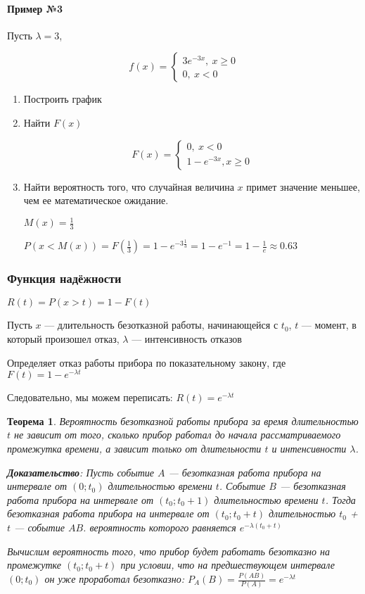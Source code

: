 \documentclass{article}
\newtheorem{theorem}{Теорема}
\begin{document}
\paragraph{Пример №3}

Пусть $\lambda = 3$,

$$f(x) = \begin{cases}
    3e^{-3x}, \ x \ge 0 \\
    0, \ x < 0
\end{cases}$$

\begin{enumerate}
    \item Построить график
    \item Найти $F(x)$

    $$F(x) = \begin{cases}
        0, \ x < 0 \\
        1 - e^{-3x}, x \ge 0
    \end{cases}$$
    \item Найти вероятность того, что случайная величина $x$ примет значение меньшее, чем ее математическое ожидание.
    
    $M(x) = \frac{1}{3}$

    $P(x < M(x)) = F(\frac{1}{3}) = 1 - e^{-3 \frac{1}{3}} = 1 - e^{-1} = 1 - \frac{1}{e} \approx 0.63$
\end{enumerate}

\subsubsection{Функция надёжности}

$R(t) = P(x > t) = 1 - F(t)$

Пусть $x$ — длительность безотказной работы, начинающейся с $t_0$, $t$ — момент, в который произошел отказ, $\lambda$ — интенсивность отказов

Определяет отказ работы прибора по показательному закону, где $F(t) = 1 - e^{-\lambda t}$

Следовательно, мы можем переписать: $R(t) = e^{-\lambda t}$

\begin{theorem}
    Вероятность безотказной работы прибора за время длительностью $t$ не зависит от того, сколько прибор работал до начала рассматриваемого промежутка времени, а зависит только от длительности $t$ и интенсивности $\lambda$.

    \textbf{Доказательство}: Пусть событие $A$ — безотказная работа прибора на интервале от $(0; t_0)$ длительностью времени $t$. Событие $B$ — безотказная работа прибора на интервале от $(t_0; t_0 + 1)$ длительностью времени $t$. Тогда безотказная работа прибора на интервале от $(t_0; t_0 + t)$ длительностью $t_0$ + $t$ — событие $AB$. вероятность которого равняется $e^{-\lambda (t_0 + t)}$

    Вычислим вероятность того, что прибор будет работать безотказно на промежутке $(t_0; t_0 + t)$ при условии, что на предшествующем интервале $(0; t_0)$ он уже проработал безотказно: $P_{A}(B) = \frac{P(AB)}{P(A)} = e^{-\lambda t}$
\end{theorem}
\end{document}

